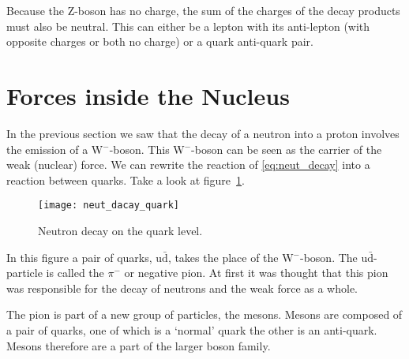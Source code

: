 Because the Z-boson has no charge, the sum of the charges of the decay products must also be neutral. This can either be a lepton with its anti-lepton (with opposite charges or both no charge) or a quark anti-quark pair.

\section{Forces inside the Nucleus}
In the previous section we saw that the decay of a neutron into a proton involves the emission of a W$^-$-boson. This W$^-$-boson can be seen as the carrier of the weak (nuclear) force. We can rewrite the reaction of \ref{eq:neut_decay} into a reaction between quarks. Take a look at figure~\ref{fig:neut_dacay_quark}.

\begin{figure}\begin{center}
\texttt{[image: neut\_dacay\_quark]}%
\caption{Neutron decay on the quark level.}\label{fig:neut_dacay_quark}
\end{center}\end{figure}

In this figure a pair of quarks, u$\bar{\mbox{d}}$, takes the place of the W$^-$-boson. The u$\bar{\mbox{d}}$-particle is called the $\pi^-$ or negative pion. At first it was thought that this pion was responsible for the decay of neutrons and the weak force as a whole.

The pion is part of a new group of particles, the mesons. Mesons are composed of a pair of quarks, one of which is a `normal' quark the other is an anti-quark. Mesons therefore are a part of the larger boson family.


